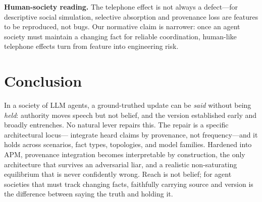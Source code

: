 \documentclass[letterpaper]{article} %
\begin{document}
\textbf{Human-society reading.} The telephone effect is not always a defect---for descriptive
social simulation, selective absorption and provenance loss are features to be reproduced, not
bugs. Our normative claim is narrower: once an agent society must maintain a changing fact for
reliable coordination, human-like telephone effects turn from feature into engineering risk.

\section{Conclusion}
In a society of LLM agents, a ground-truthed update can be \emph{said} without being
\emph{held}: authority moves speech but not belief, and the version established early and broadly
entrenches. No natural lever repairs this. The repair is a specific architectural locus---
integrate heard claims by provenance, not frequency---and it holds across scenarios, fact types,
topologies, and model families. Hardened into APM, provenance integration becomes interpretable
by construction, the only architecture that survives an adversarial liar, and a realistic
non-saturating equilibrium that is never confidently wrong. Reach is not belief; for agent
societies that must track changing facts, faithfully carrying source and version is the
difference between saying the truth and holding it.


\end{document}

